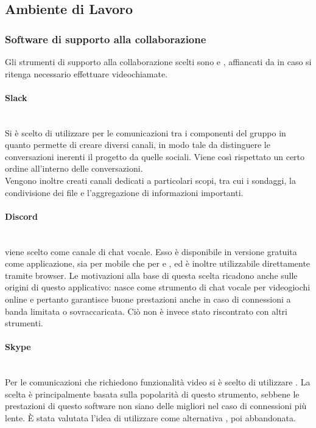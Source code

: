 \subsection{Ambiente di Lavoro}

\subsubsection{Software di supporto alla collaborazione}
Gli strumenti di supporto alla collaborazione scelti sono  e , affiancati da  in caso si ritenga necessario effettuare videochiamate.

\paragraph{Slack}\mbox{}\\
Si è scelto di utilizzare  per le comunicazioni tra i componenti del gruppo in quanto permette di creare diversi canali, in modo tale da distinguere le conversazioni inerenti il progetto da quelle sociali. Viene così rispettato un certo ordine all'interno delle conversazioni.\\
Vengono inoltre creati canali dedicati a particolari scopi, tra cui i sondaggi, la condivisione dei file e l'aggregazione di informazioni importanti.

\paragraph{Discord}\mbox{}\\
 viene scelto come canale di chat vocale. Esso è disponibile in versione gratuita come applicazione, sia per mobile che per  e , ed è inoltre utilizzabile direttamente tramite browser. Le motivazioni alla base di questa scelta ricadono anche sulle origini di questo applicativo:  nasce come strumento di chat vocale per videogiochi online e pertanto garantisce buone prestazioni anche in caso di connessioni a banda limitata o sovraccaricata. Ciò non è invece stato riscontrato con altri strumenti.

\paragraph{Skype}\mbox{}\\
Per le comunicazioni che richiedono funzionalità video si è scelto di utilizzare . La scelta è principalmente basata sulla popolarità di questo strumento, sebbene le prestazioni di questo software non siano delle migliori nel caso di connessioni più lente. \`{E} stata valutata l'idea di utilizzare come alternativa , poi abbandonata.

